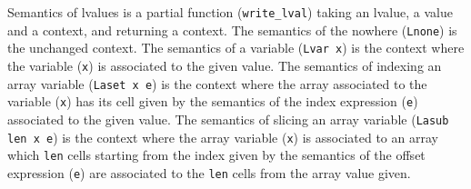 \documentclass{article}
\begin{document}
Semantics of lvalues is a partial function (\texttt{write\_lval}) taking an
lvalue, a value and a context, and returning a context.
The semantics of the nowhere (\texttt{Lnone}) is the unchanged context. The
semantics of a variable (\texttt{Lvar x}) is the context where the variable
(\texttt{x}) is associated to the given value. The semantics of indexing an
array variable (\texttt{Laset x e}) is the context where the array associated
to the variable (\texttt{x}) has its cell given by the semantics of the index
expression (\texttt{e}) associated to the given value. The semantics of slicing
an array variable (\texttt{Lasub len x e}) is the context where the array
variable (\texttt{x}) is associated to an array which \texttt{len} cells
starting from the index given by the semantics of the offset expression
(\texttt{e}) are associated to the \texttt{len} cells from the array value
given.

\medskip
\end{document}

